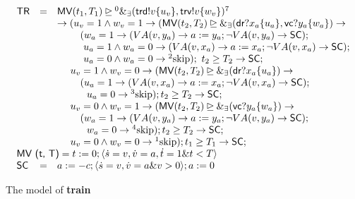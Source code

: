 \documentclass{llncs}
\newcommand{\pskip}{\textmd{skip}}
\begin{document}
\begin{table}[t]
\small
\centering
\[\begin{array}{lll}
  \textsf{TR} &=& \textsf{MV}(t_1, T_1) \unrhd {}^0 \&_\exists(\textsf{trd}!v\{u_v\}, \textsf{trv}!v\{w_v\}){}^{7}\\
  && \rightarrow  (u_v=1 \wedge w_v=1 \rightarrow (\textsf{MV}(t_2, T_2) \unrhd\&_\exists (\textsf{dr}?x_a\{u_a\}, \textsf{vc}?y_a\{w_a\}) \rightarrow\\
  &&\qquad\ (w_a = 1 \rightarrow  (VA(v, y_a) \rightarrow a: = y_a; \neg VA(v, y_a) \rightarrow \textsf{SC});\\
  &&\qquad\ \ u_a = 1\wedge w_a = 0 \rightarrow (VA(v, x_a) \rightarrow a: = x_a; \neg VA(v, x_a) \rightarrow \textsf{SC});\\
  &&\qquad\ \ u_a = 0 \wedge w_a = 0 \rightarrow  {}^2 \pskip);\   t_2\geq T_2 \rightarrow \textsf{SC};\\
&&\quad \ u_v=1 \wedge w_v=0  \rightarrow (\textsf{MV}(t_2, T_2) \unrhd\&_\exists (\textsf{dr}?x_a\{u_a\}) \rightarrow\\
  &&\qquad\ (u_a = 1 \rightarrow (VA(v, x_a) \rightarrow a: = x_a;\neg VA(v, x_a) \rightarrow \textsf{SC});  \\
    &&\qquad\quad  u_a = 0 \rightarrow  {}^3\pskip); t_2\geq T_2 \rightarrow \textsf{SC};\\
&&\quad \ u_v=0 \wedge w_v=1  \rightarrow  (\textsf{MV}(t_2, T_2) \unrhd\&_\exists (\textsf{vc}?y_a\{w_a\}) \rightarrow\\
  &&\qquad \ (w_a = 1 \rightarrow (VA(v, y_a) \rightarrow a: = y_a; \neg VA(v, y_a) \rightarrow \textsf{SC}); \\
    &&\qquad\quad  w_a = 0 \rightarrow {}^4 \pskip); t_2\geq T_2 \rightarrow \textsf{SC};\\
&& \quad\ u_v=0 \wedge w_v=0  \rightarrow  {}^1 \pskip); t_1\geq T_1 \rightarrow \textsf{SC};\\
\multicolumn{3}{l}{ \textsf{MV (t, T)} =  t:=0; \langle \dot{s} = v, \dot{v} = a, \dot{t} = 1 \& t<T \rangle}\\
  \textsf{SC} &= & a:=-c; \langle \dot{s} = v, \dot{v} = a \&  v>0 \rangle; a:=0
\end{array} \]
\caption{The model of \textbf{train}}
\label{trainmodell}
\end{table}
\end{document}
